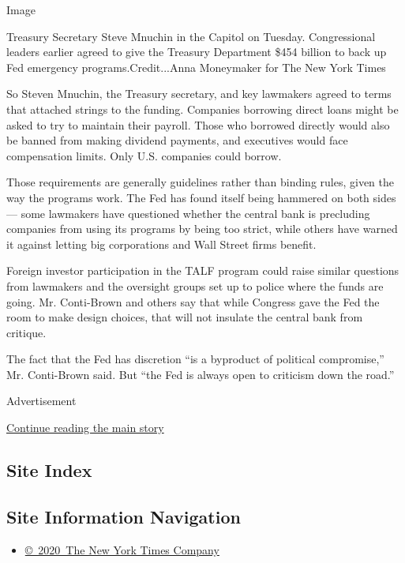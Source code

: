 Image

Treasury Secretary Steve Mnuchin in the Capitol on Tuesday.
Congressional leaders earlier agreed to give the Treasury Department
\$454 billion to back up Fed emergency programs.Credit...Anna Moneymaker
for The New York Times

So Steven Mnuchin, the Treasury secretary, and key lawmakers agreed to
terms that attached strings to the funding. Companies borrowing direct
loans might be asked to try to maintain their payroll. Those who
borrowed directly would also be banned from making dividend payments,
and executives would face compensation limits. Only U.S. companies could
borrow.

Those requirements are generally guidelines rather than binding rules,
given the way the programs work. The Fed has found itself being hammered
on both sides --- some lawmakers have questioned whether the central
bank is precluding companies from using its programs by being too
strict, while others have warned it against letting big corporations and
Wall Street firms benefit.

Foreign investor participation in the TALF program could raise similar
questions from lawmakers and the oversight groups set up to police where
the funds are going. Mr. Conti-Brown and others say that while Congress
gave the Fed the room to make design choices, that will not insulate the
central bank from critique.

The fact that the Fed has discretion ``is a byproduct of political
compromise,'' Mr. Conti-Brown said. But ``the Fed is always open to
criticism down the road.''

Advertisement

\protect\hyperlink{after-bottom}{Continue reading the main story}

\hypertarget{site-index}{%
\subsection{Site Index}\label{site-index}}

\hypertarget{site-information-navigation}{%
\subsection{Site Information
Navigation}\label{site-information-navigation}}

\begin{itemize}
\tightlist
\item
  \href{https://help.nytimes3xbfgragh.onion/hc/en-us/articles/115014792127-Copyright-notice}{©~2020~The
  New York Times Company}
\end{itemize}

